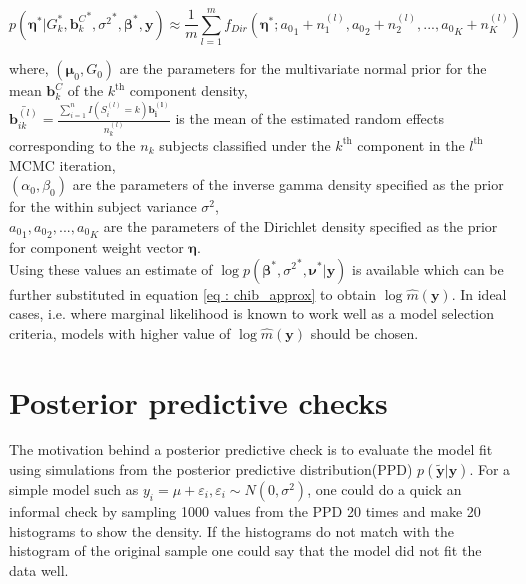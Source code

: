 \begin{equation}
p({\boldsymbol{\eta}}^*|G_k^*, {\boldsymbol{b}_k^C}^*, {\sigma^2}^*,{\boldsymbol{\beta}}^*, \boldsymbol{y}) \approx 
\frac 1 m \sum_{l=1}^m f_{Dir}({\boldsymbol{\eta}}^*; {a_0}_1 + n_1^{(l)}, {a_0}_2 + n_2^{(l)}, ..., {a_0}_K + n_K^{(l)})
\end{equation}

where, 
$(\boldsymbol{\mu}_0, G_0)$ are the parameters for the multivariate normal prior for the mean $\boldsymbol{b}_k^C$ of the $k^\text{th}$ component density,\\
$\bar{\boldsymbol{b}_{ik}^{(l)}} = \frac {\sum_{i=1}^n I(S_i^{(l)}=k) \boldsymbol{b_i^{(l)}}} {n_k^{(l)}}$ is the mean of the estimated random effects corresponding to the $n_k$ subjects classified under the $k^\text{th}$ component in the $l^\text{th}$ MCMC iteration,\\
$(\alpha_0, \beta_0)$ are the parameters of the inverse gamma density specified as the prior for the within subject variance $\sigma^2$,\\
${a_0}_1, {a_0}_2,..., {a_0}_K$ are the parameters of the Dirichlet density specified as the prior for component weight vector $\boldsymbol{\eta}$.\\

Using these values an estimate of $\log{p({\boldsymbol{\beta}}^*, {\sigma^2}^*, \boldsymbol{\nu}^*|\boldsymbol{y})}$ is available which can be further substituted in equation \ref{eq : chib_approx} to obtain $\log{\hat{m}(\boldsymbol{y})}$. In ideal cases, i.e. where marginal likelihood is known to work well as a model selection criteria, models with higher value of $\log{\hat{m}(\boldsymbol{y})}$ should be chosen.

\section{Posterior predictive checks}
\label{sec : ppc}
The motivation behind a posterior predictive check is to evaluate the model fit using simulations from the posterior predictive distribution(PPD) $p(\boldsymbol{\tilde{y}}|\boldsymbol{y})$. For a simple model such as $y_i = \mu + \varepsilon_i, \varepsilon_i \sim N(0, \sigma^2)$, one could do a quick an informal check by sampling 1000 values from the PPD 20 times and make 20 histograms to show the density. If the histograms do not match with the histogram of the original sample one could say that the model did not fit the data well.\\


